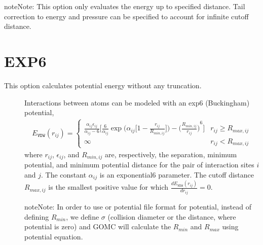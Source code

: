 \documentclass[letterpaper,10pt,english]{sphinxmanual}
\begin{document}
\begin{sphinxadmonition}{note}{Note:}
This option only evaluates the energy up to specified  distance. Tail correction to energy and pressure can be specified to account for infinite cutoff distance.
\end{sphinxadmonition}


\section{EXP6}
\label{\detokenize{vdw_energy:exp6}}
This option calculates potential energy without any truncation.
\begin{description}
\item[{}] \leavevmode
Interactions between atoms can be modeled with an exp\sphinxhyphen{}6 (Buckingham) potential,
\begin{equation*}
\begin{split}E_{\texttt{VDW}}(r_{ij}) =
\begin{cases}
  \frac{\alpha_{ij}\epsilon_{ij}}{\alpha_{ij}-6} \bigg[\frac{6}{\alpha_{ij}} \exp\bigg(\alpha_{ij} \bigg[1-\frac{r_{ij}}{R_{min,ij}} \bigg]\bigg) - {\bigg(\frac{R_{min,ij}}{r_{ij}}\bigg)}^6 \bigg] &  r_{ij} \geq R_{max,ij} \\
  \infty & r_{ij} < R_{max,ij}
\end{cases}\end{split}
\end{equation*}
where \(r_{ij}\), \(\epsilon_{ij}\), and \(R_{min,ij}\) are, respectively, the separation, minimum potential, and minimum potential distance for the pair of interaction sites \(i\) and \(j\).
The constant \(\alpha_{ij}\) is an  exponential\sphinxhyphen{}6 parameter. The cutoff distance \(R_{max,ij}\) is the smallest positive value for which \(\frac{dE_{\texttt{VDW}}(r_{ij})}{dr_{ij}}=0\).

\begin{sphinxadmonition}{note}{Note:}
In order to use  or  potential file format for  potential, instead of defining \(R_{min}\), we define \(\sigma\) (collision diameter or the distance, where potential is zero)
and GOMC will calculate the \(R_{min}\) and \(R_{max}\) using  potential equation.
\end{sphinxadmonition}


\end{description}
\end{document}
